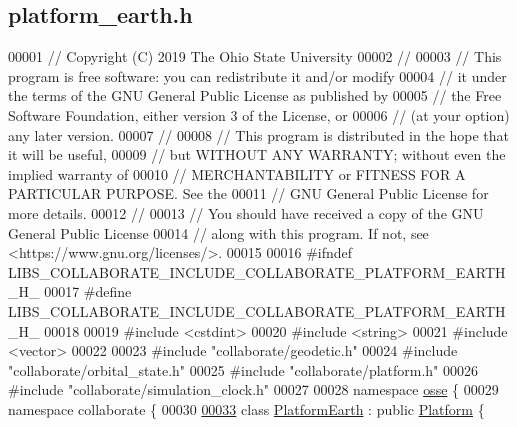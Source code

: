 \hypertarget{platform__earth_8h_source}{}\subsection{platform\+\_\+earth.\+h}
\label{platform__earth_8h_source}

\begin{DoxyCode}
00001 \textcolor{comment}{// Copyright (C) 2019 The Ohio State University}
00002 \textcolor{comment}{//}
00003 \textcolor{comment}{// This program is free software: you can redistribute it and/or modify}
00004 \textcolor{comment}{// it under the terms of the GNU General Public License as published by}
00005 \textcolor{comment}{// the Free Software Foundation, either version 3 of the License, or}
00006 \textcolor{comment}{// (at your option) any later version.}
00007 \textcolor{comment}{//}
00008 \textcolor{comment}{// This program is distributed in the hope that it will be useful,}
00009 \textcolor{comment}{// but WITHOUT ANY WARRANTY; without even the implied warranty of}
00010 \textcolor{comment}{// MERCHANTABILITY or FITNESS FOR A PARTICULAR PURPOSE.  See the}
00011 \textcolor{comment}{// GNU General Public License for more details.}
00012 \textcolor{comment}{//}
00013 \textcolor{comment}{// You should have received a copy of the GNU General Public License}
00014 \textcolor{comment}{// along with this program.  If not, see <https://www.gnu.org/licenses/>.}
00015 
00016 \textcolor{preprocessor}{#ifndef LIBS\_COLLABORATE\_INCLUDE\_COLLABORATE\_PLATFORM\_EARTH\_H\_}
00017 \textcolor{preprocessor}{#define LIBS\_COLLABORATE\_INCLUDE\_COLLABORATE\_PLATFORM\_EARTH\_H\_}
00018 
00019 \textcolor{preprocessor}{#include <cstdint>}
00020 \textcolor{preprocessor}{#include <string>}
00021 \textcolor{preprocessor}{#include <vector>}
00022 
00023 \textcolor{preprocessor}{#include "collaborate/geodetic.h"}
00024 \textcolor{preprocessor}{#include "collaborate/orbital\_state.h"}
00025 \textcolor{preprocessor}{#include "collaborate/platform.h"}
00026 \textcolor{preprocessor}{#include "collaborate/simulation\_clock.h"}
00027 
00028 \textcolor{keyword}{namespace }\hyperlink{namespaceosse}{osse} \{
00029 \textcolor{keyword}{namespace }collaborate \{
00030 
\hyperlink{classosse_1_1collaborate_1_1_platform_earth}{00033} \textcolor{keyword}{class }\hyperlink{classosse_1_1collaborate_1_1_platform_earth}{PlatformEarth} : \textcolor{keyword}{public} \hyperlink{classosse_1_1collaborate_1_1_platform}{Platform} \{

\end{DoxyCode}
